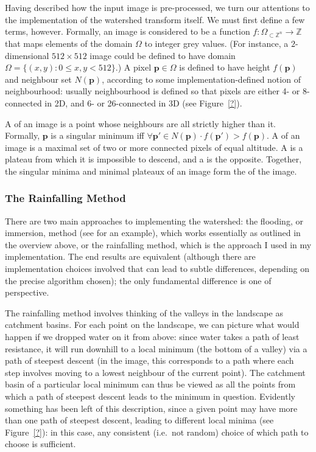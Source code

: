 Having described how the input image is pre-processed, we turn our attentions to the implementation of the watershed transform itself. We must first define a few terms, however. Formally, an image is considered to be a function $f: \Omega_{\subset \mathbb{Z}^n} \to \mathbb{Z}$ that maps elements of the domain $\Omega$ to integer grey values. (For instance, a $2$-dimensional $512 \times 512$ image could be defined to have domain $\Omega = \{(x,y) : 0 \le x,y < 512\}$.) A pixel $\mathbf{p} \in \Omega$ is defined to have height $f(\mathbf{p})$ and neighbour set $N(\mathbf{p})$, according to some implementation-defined notion of neighbourhood: usually neighbourhood is defined so that pixels are either 4- or 8-connected in 2D, and 6- or 26-connected in 3D (see Figure~\ref{?}).


A  of an image is a point whose neighbours are all strictly higher than it. Formally, $\mathbf{p}$ is a singular minimum iff $\forall \mathbf{p'} \in N(\mathbf{p}) \cdot f(\mathbf{p'}) > f(\mathbf{p})$. A  of an image is a maximal set of two or more connected pixels of equal altitude. A  is a plateau from which it is impossible to descend, and a  is the opposite. Together, the singular minima and minimal plateaux of an image form the  of the image.

\subsubsection{The Rainfalling Method}

There are two main approaches to implementing the watershed: the flooding, or immersion, method (see \cite{?} for an example), which works essentially as outlined in the overview above, or the rainfalling method, which is the approach I used in my implementation. The end results are equivalent (although there are implementation choices involved that can lead to subtle differences, depending on the precise algorithm chosen); the only fundamental difference is one of perspective.

The rainfalling method involves thinking of the valleys in the landscape as catchment basins. For each point on the landscape, we can picture what would happen if we dropped water on it from above: since water takes a path of least resistance, it will run downhill to a local minimum (the bottom of a valley) via a path of steepest descent (in the image, this corresponds to a path where each step involves moving to a lowest neighbour of the current point). The catchment basin of a particular local minimum can thus be viewed as all the points from which a path of steepest descent leads to the minimum in question. Evidently something has been left of this description, since a given point may have more than one path of steepest descent, leading to different local minima (see Figure~\ref{?}): in this case, any consistent (i.e.~not random) choice of which path to choose is sufficient.

